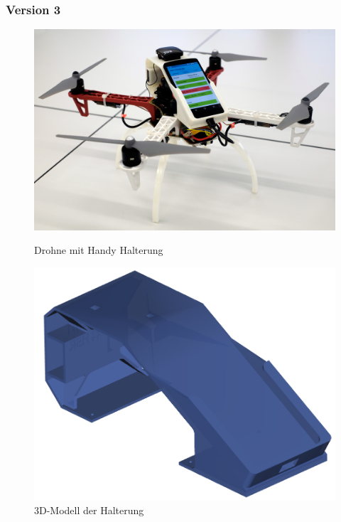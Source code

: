 \subsubsection{Version 3}
\begin{figure}[H]
	\centering
	\begin{minipage}[b]{0.45\textwidth}
		\centering
		\includegraphics[width=\textwidth]{images/drone2.jpg}
		\caption{Drohne mit Handy Halterung}
		\label{fig:prototyp-3}
	\end{minipage}
	\hfill
	\begin{minipage}[b]{0.35\textwidth}
		\centering
		\includegraphics[width=\textwidth]{images/hardware/case-model.png}
		\caption{3D-Modell der Halterung}
		\label{fig:case-model}
	\end{minipage}
\end{figure}

